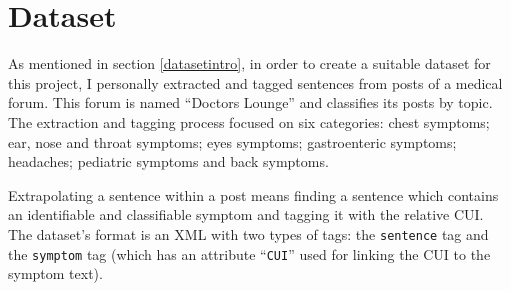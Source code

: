 \section{Dataset}
\label{sec:dataset}
As mentioned in section \ref{datasetintro}, in order to create a suitable dataset for this project, I personally extracted and tagged sentences from posts of a medical forum. This forum is named ``Doctors Lounge'' \cite{doctorslounge} and classifies its posts by topic. The extraction and tagging process focused on six categories: chest symptoms; ear, nose and throat symptoms; eyes symptoms; gastroenteric symptoms; headaches; pediatric symptoms and back symptoms.

Extrapolating a sentence within a post means finding a sentence which contains an identifiable and classifiable symptom and tagging it with the relative CUI. The dataset's format is an XML with two types of tags: the \texttt{sentence} tag and the \texttt{symptom} tag (which has an attribute ``\texttt{CUI}'' used for linking the CUI to the symptom text).
